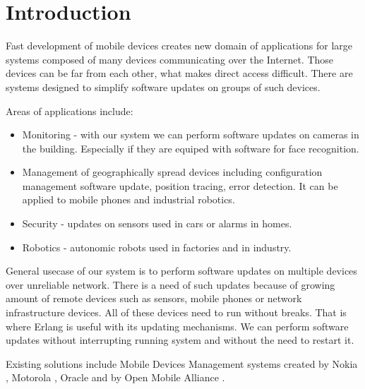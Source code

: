 \section{Introduction}

Fast development of mobile devices creates new domain of applications for large systems composed of many devices communicating over the Internet.
Those devices can be far from each other, what makes direct access difficult. There are systems designed to simplify software updates on groups of such devices.

Areas of applications include:
\begin{itemize}
    \item Monitoring - with our system we can perform software updates on cameras in the building. Especially if they are equiped with software for face recognition.
    \item Management of geographically spread devices including configuration management software update, position tracing, error detection.
	It can be applied to mobile phones and industrial robotics.
    \item Security - updates on sensors used in cars or alarms in homes.
    \item Robotics - autonomic robots used in factories and in industry.
\end{itemize}

General usecase of our system is to perform software updates on multiple devices over unreliable network. There is a need of such updates because of growing amount of remote devices such as sensors, mobile phones or network infrastructure devices. All of these devices need to run without breaks. That is where Erlang is useful with its updating mechanisms. We can perform software updates without interrupting running system and without the need to restart it.

 Existing solutions include Mobile Devices Management systems created by Nokia \cite{nokia}, Motorola \cite{motorola}, Oracle \cite{oracle} and by Open Mobile Alliance \cite{oma}.
